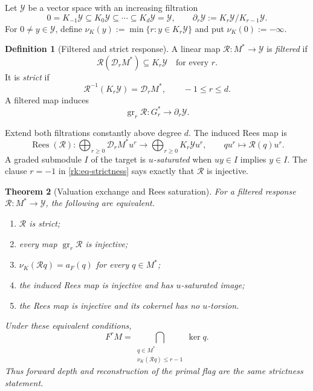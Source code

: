 \documentclass[10pt,reqno]{amsart}
\theoremstyle{plain}
\newtheorem{theorem}{Theorem}[section]
\theoremstyle{definition}
\newtheorem{definition}[theorem]{Definition}
\theoremstyle{remark}
\begin{document}
Let $\mathcal Y$ be a vector space with an increasing filtration
\[
 0=K_{-1}\mathcal Y\subseteq K_0\mathcal Y\subseteq\cdots
 \subseteq K_d\mathcal Y=\mathcal Y,
 \qquad
 \partial_r\mathcal Y:=K_r\mathcal Y/K_{r-1}\mathcal Y.
\]
For $0\ne y\in\mathcal Y$, define
$\nu_K(y):=\min\{r:y\in K_r\mathcal Y\}$ and put
$\nu_K(0):=-\infty$.

\begin{definition}[Filtered and strict response]
\label{rk:def-filtered-strict}
A linear map $\mathcal R:M^*\to\mathcal Y$ is \emph{filtered} if
\[
 \mathcal R(\mathscr D_rM^*)\subseteq K_r\mathcal Y
 \quad\text{for every }r.
\]
It is \emph{strict} if
\begin{equation}
 \mathcal R^{-1}(K_r\mathcal Y)=\mathscr D_rM^*,
 \qquad -1\le r\le d.
 \label{rk:eq-strictness}
\end{equation}
A filtered map induces
\begin{equation}
 \operatorname{gr}_r\mathcal R:
 G_r^*\longrightarrow\partial_r\mathcal Y.
 \label{rk:eq-graded-response}
\end{equation}
\end{definition}

Extend both filtrations constantly above degree \(d\).  The induced Rees map is
\begin{equation}
 \operatorname{Rees}(\mathcal R):
 \bigoplus_{r\ge0}\mathscr D_rM^*u^r
 \longrightarrow
 \bigoplus_{r\ge0}K_r\mathcal Yu^r,
 \qquad qu^r\longmapsto\mathcal R(q)u^r.
 \label{rk:eq-Rees-map}
\end{equation}
A graded submodule \(I\) of the target is \emph{\(u\)-saturated} when
\(uy\in I\) implies \(y\in I\).  The clause \(r=-1\) in
\eqref{rk:eq-strictness} says exactly that \(\mathcal R\) is injective.

\begin{theorem}[Valuation exchange and Rees saturation]
\label{rk:thm-valuation-exchange}
For a filtered response $\mathcal R:M^*\to\mathcal Y$, the following are
equivalent.
\begin{enumerate}[label=\textup{(\roman*)},leftmargin=2.8em]
\item $\mathcal R$ is strict;
\item every map $\operatorname{gr}_r\mathcal R$ is injective;
\item $\nu_K(\mathcal Rq)=a_F(q)$ for every $q\in M^*$;
\item the induced Rees map is injective and has $u$-saturated image;
\item the Rees map is injective and its cokernel has no $u$-torsion.
\end{enumerate}
Under these equivalent conditions,
\begin{equation}
 \boxed{
 F^rM=
 \bigcap_{\substack{q\in M^*\\
              \nu_K(\mathcal Rq)\le r-1}}
 \ker q.}
 \label{rk:eq-flag-reconstruction}
\end{equation}
Thus forward depth and reconstruction of the primal flag are the same
strictness statement.
\end{theorem}
\end{document}
